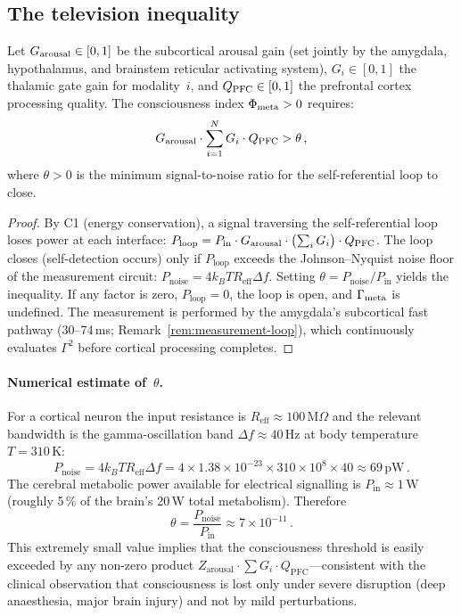 \documentclass[aps,pre,twocolumn,superscriptaddress,floatfix]{revtex4-2}
\begin{document}
\subsection{The television inequality}

\begin{theorem}
\label{thm:television}
Let $G_{\text{arousal}}\in[0,1]$ be the subcortical arousal gain
(set jointly by the amygdala, hypothalamus, and
brainstem reticular activating system),
$G_i\in[0,1]$ the thalamic gate gain for modality~$i$,
and $Q_{\text{PFC}}\in[0,1]$ the prefrontal cortex processing
quality.  The consciousness index $\Phi_{\text{meta}}>0$ requires:
\begin{equation}
  G_{\text{arousal}} \cdot \sum_{i=1}^{N} G_i \cdot Q_{\text{PFC}} > \theta\,,
  \label{eq:TV-inequality}
\end{equation}
where $\theta>0$ is the minimum signal-to-noise ratio for
the self-referential loop to close.
\end{theorem}

\begin{proof}
By C1 (energy conservation), a signal traversing the
self-referential loop loses power at each interface:
$P_{\text{loop}} = P_{\text{in}} \cdot G_{\text{arousal}}
\cdot \bigl(\sum_{i} G_i\bigr) \cdot Q_{\text{PFC}}$.
The loop closes (self-detection occurs) only if
$P_{\text{loop}}$ exceeds the Johnson--Nyquist noise
floor of the measurement circuit:
$P_{\text{noise}} = 4 k_B T R_{\text{eff}} \Delta f$.
Setting $\theta = P_{\text{noise}} / P_{\text{in}}$
yields the inequality.
If any factor is zero, $P_{\text{loop}} = 0$, the loop
is open, and $\Gamma_{\text{meta}}$ is undefined.
The measurement is performed by the amygdala's
subcortical fast pathway (30--74\,ms;
Remark~\ref{rem:measurement-loop}), which continuously
evaluates $\Gamma^2$ before cortical processing
completes.
\end{proof}

\paragraph{Numerical estimate of~$\theta$.}
For a cortical neuron the input resistance is
$R_{\text{eff}} \approx 100\,\text{M}\Omega$ and the
relevant bandwidth is the gamma-oscillation band
$\Delta f \approx 40\,\text{Hz}$ at body temperature
$T = 310\,\text{K}$:
\[
  P_{\text{noise}}
  = 4 k_B T R_{\text{eff}} \Delta f
  = 4 \times 1.38 \times 10^{-23}
    \times 310 \times 10^{8} \times 40
  \approx 69\,\text{pW}\,.
\]
The cerebral metabolic power available for
electrical signalling is $P_{\text{in}} \approx 1\,\text{W}$
(roughly 5\,\% of the brain's 20\,W total metabolism).
Therefore
\[
  \theta
  = \frac{P_{\text{noise}}}{P_{\text{in}}}
  \approx 7 \times 10^{-11}\,.
\]
This extremely small value implies that the
consciousness threshold is easily exceeded by any
non-zero product $Z_{\text{arousal}} \cdot \sum G_i
\cdot Q_{\text{PFC}}$---consistent with the clinical
observation that consciousness is lost only under
severe disruption (deep anaesthesia, major brain
injury) and not by mild perturbations.
\end{document}

